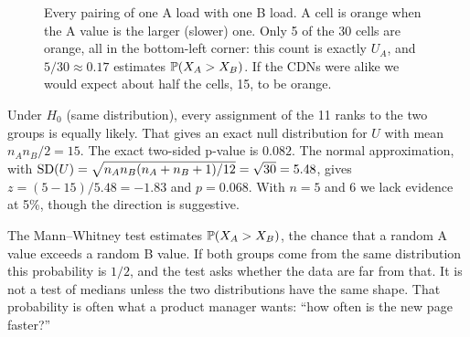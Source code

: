 \begin{figure}[H]
\centering
{}
\caption{Every pairing of one A load with one B load. A cell is orange when the
A value is the larger (slower) one. Only 5 of the 30 cells are orange, all in
the bottom-left corner: this count is exactly $U_A$, and $5/30 \approx 0.17$
estimates $\P(X_A > X_B)$. If the CDNs were alike we would expect about half
the cells, 15, to be orange.}
\label{fig:cg-upairs}
\end{figure}

Under $H_0$ (same distribution), every assignment of the 11 ranks to the two
groups is equally likely. That gives an exact null distribution for $U$ with
mean $n_A n_B / 2 = 15$. The exact two-sided p-value is $0.082$. The normal
approximation, with $\SD(U) = \sqrt{n_An_B(n_A+n_B+1)/12} = \sqrt{30} = 5.48$,
gives $z = (5 - 15)/5.48 = -1.83$ and $p = 0.068$. With $n = 5$ and $6$ we
lack evidence at 5\%, though the direction is suggestive.

\begin{intuitionbox}
The Mann--Whitney test estimates $\P(X_A > X_B)$, the chance that a random A
value exceeds a random B value. If both groups come from the same
distribution this probability is $1/2$, and the test asks whether the data are
far from that. It is not a test
of medians unless the two distributions have the same shape. That probability
is often what a product manager wants: ``how often is the new page
faster?''
\end{intuitionbox}

